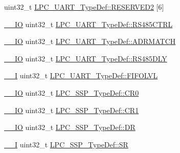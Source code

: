 \begin{DoxyCompactItemize}
\item 
uint32\+\_\+t \hyperlink{group___l_p_c11xx___definitions_ga529759b9e0e7aba3cb0e6f2b5c0b93ed}{L\+P\+C\+\_\+\+U\+A\+R\+T\+\_\+\+Type\+Def\+::\+R\+E\+S\+E\+R\+V\+E\+D2} \mbox{[}6\mbox{]}
\item 
\hyperlink{group___c_m_s_i_s__core__definitions_gaec43007d9998a0a0e01faede4133d6be}{\+\_\+\+\_\+\+IO} uint32\+\_\+t \hyperlink{group___l_p_c11xx___definitions_ga7a486c0c1ea4054b08a3893a6d7d1202}{L\+P\+C\+\_\+\+U\+A\+R\+T\+\_\+\+Type\+Def\+::\+R\+S485\+C\+T\+RL}
\item 
\hyperlink{group___c_m_s_i_s__core__definitions_gaec43007d9998a0a0e01faede4133d6be}{\+\_\+\+\_\+\+IO} uint32\+\_\+t \hyperlink{group___l_p_c11xx___definitions_gaf2171616d6659b7f82a217b465ba0e3d}{L\+P\+C\+\_\+\+U\+A\+R\+T\+\_\+\+Type\+Def\+::\+A\+D\+R\+M\+A\+T\+CH}
\item 
\hyperlink{group___c_m_s_i_s__core__definitions_gaec43007d9998a0a0e01faede4133d6be}{\+\_\+\+\_\+\+IO} uint32\+\_\+t \hyperlink{group___l_p_c11xx___definitions_ga115176a87a83f57041b8ee50e2a4bc98}{L\+P\+C\+\_\+\+U\+A\+R\+T\+\_\+\+Type\+Def\+::\+R\+S485\+D\+LY}
\item 
\hyperlink{group___c_m_s_i_s__core__definitions_gaf63697ed9952cc71e1225efe205f6cd3}{\+\_\+\+\_\+I} uint32\+\_\+t \hyperlink{group___l_p_c11xx___definitions_ga3a853929f0e5b479297d55f150bf017e}{L\+P\+C\+\_\+\+U\+A\+R\+T\+\_\+\+Type\+Def\+::\+F\+I\+F\+O\+L\+VL}
\item 
\hyperlink{group___c_m_s_i_s__core__definitions_gaec43007d9998a0a0e01faede4133d6be}{\+\_\+\+\_\+\+IO} uint32\+\_\+t \hyperlink{group___l_p_c11xx___definitions_ga32a68722d4e2c1b7dfc787c779a380a3}{L\+P\+C\+\_\+\+S\+S\+P\+\_\+\+Type\+Def\+::\+C\+R0}
\item 
\hyperlink{group___c_m_s_i_s__core__definitions_gaec43007d9998a0a0e01faede4133d6be}{\+\_\+\+\_\+\+IO} uint32\+\_\+t \hyperlink{group___l_p_c11xx___definitions_ga016ea63a8c118f5b75a64a6e5f81c984}{L\+P\+C\+\_\+\+S\+S\+P\+\_\+\+Type\+Def\+::\+C\+R1}
\item 
\hyperlink{group___c_m_s_i_s__core__definitions_gaec43007d9998a0a0e01faede4133d6be}{\+\_\+\+\_\+\+IO} uint32\+\_\+t \hyperlink{group___l_p_c11xx___definitions_ga305381985bf14d72c35b97ac3b56661e}{L\+P\+C\+\_\+\+S\+S\+P\+\_\+\+Type\+Def\+::\+DR}
\item 
\hyperlink{group___c_m_s_i_s__core__definitions_gaf63697ed9952cc71e1225efe205f6cd3}{\+\_\+\+\_\+I} uint32\+\_\+t \hyperlink{group___l_p_c11xx___definitions_ga82edd1e82e00dbdc9db58e5173893d77}{L\+P\+C\+\_\+\+S\+S\+P\+\_\+\+Type\+Def\+::\+SR}

\end{DoxyCompactItemize}
